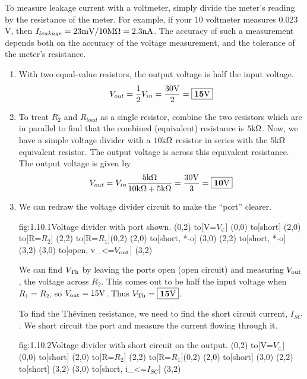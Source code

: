 \documentclass{article}
\begin{document}
	To measure leakage current with a voltmeter, simply divide the meter's reading by the resistance of the meter.  For example, if your 10 \M\Ohm \space voltmeter measures 0.023 V, then $I_{leakage} = 23 \text{m}\text{V} / 10 \text{M}\Omega = 2.3 \text{n}\text{A}$.  The accuracy of such a measurement depends both on the accuracy of the voltage measurement, and the tolerance of the meter's resistance.
    
    \begin{enumerate}
        \item 
        With two equal-value resistors, the output voltage is half the input voltage.
        \[V_{out} = \frac{1}{2}V_{in} = \frac{30\text{V}}{2} = \boxed{\mathbf{15\text{V}}}\]

        \item 
        To treat $R_2$ and $R_{load}$ as a single resistor, combine the two resistors which are in parallel to find that the combined (equivalent) resistance is $5\text{k}\Omega$. Now, we have a simple voltage divider with a $10\text{k}\Omega$ resistor in series with the $5\text{k}\Omega$ equivalent resistor. The output voltage is across this equivalent resistance. The output voltage is given by 
        \[V_{out} = V_{in} \frac{5\text{k}\Omega}{10\text{k}\Omega + 5\text{k}\Omega} = \frac{30\text{V}}{3} = \boxed{\mathbf{10\text{V}}} \]

        \item 
        We can redraw the voltage divider circuit to make the ``port'' clearer. 
        \begin{circuit}{fig:1.10.1}{Voltage divider with port shown.}
            (0,2) to[V=$V_{\in}$] (0,0)
            to[short] (2,0)
            to[R=$R_2$] (2,2)
            to[R=$R_1$](0,2)
            (2,0) to[short, *-o] (3,0)
            (2,2) to[short, *-o] (3,2)
            (3,0) to[open, v_<=$V_{\text{out}}$] (3,2)
        \end{circuit}

        We can find $V_{\text{Th}}$ by leaving the ports open (open circuit) and measuring $V_{\text{out}}$, the voltage across $R_2$. This comes out to be half the input voltage when $R_1 = R_2$, so $V_{\text{out}} = 15\text{V}$. Thus $V_{\text{Th}} = \boxed{\mathbf{15\text{V}}}$.
        
        To find the Th\'evinen resistance, we need to find the short circuit current, $I_{SC}$. We short circuit the port and measure the current flowing through it.
        \begin{circuit}{fig:1.10.2}{Voltage divider with short circuit on the output.}
            (0,2) to[V=$V_{\in}$] (0,0) 
            to[short] (2,0)
            to[R=$R_2$] (2,2)
            to[R=$R_1$](0,2)
            (2,0) to[short] (3,0)
            (2,2) to[short] (3,2)
            (3,0) to[short, i_<=$I_{SC}$] (3,2) 
        \end{circuit}
        

\end{enumerate}
\end{document}
